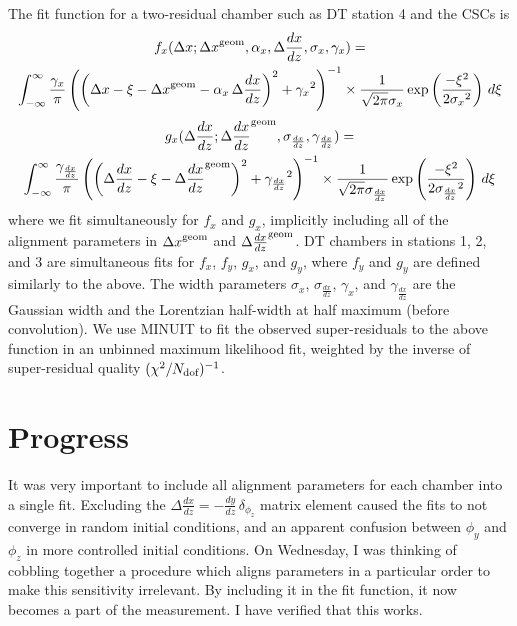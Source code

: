 \documentclass[12pt]{article}
\begin{document}
The fit function for a two-residual chamber such as DT station 4 and
the CSCs is
\begin{multline}
f_x(\Delta x; {\Delta x}^{\mbox{\scriptsize geom}}, \alpha_x, \Delta \frac{dx}{dz}, \sigma_x, \gamma_x) = \\
\int_{-\infty}^\infty
\frac{\gamma_x}{\pi}\left(\left(\Delta x - \xi - {\Delta x}^{\mbox{\scriptsize geom}} - \alpha_x \, \Delta \frac{dx}{dz}\right)^2 + {\gamma_x}^2\right)^{-1} \times 
\frac{1}{\sqrt{2\pi} \sigma_x} \exp\left(\frac{-\xi^2}{2 {\sigma_x}^2}\right) \, d\xi
\label{eqn:fitfunction1}
\end{multline}
\begin{multline}
g_x(\Delta \frac{dx}{dz}; {\Delta \frac{dx}{dz}}^{\mbox{\scriptsize geom}}, \sigma_{\frac{dx}{dz}}, \gamma_{\frac{dx}{dz}}) = \\
 \int_{-\infty}^\infty
\frac{\gamma_{\frac{dx}{dz}}}{\pi} \left(\left(\Delta \frac{dx}{dz} - \xi - {\Delta \frac{dx}{dz}}^{\mbox{\scriptsize geom}}\right)^2 + {\gamma_{\frac{dx}{dz}}}^2\right)^{-1} \times 
\frac{1}{\sqrt{2\pi} \sigma_{\frac{dx}{dz}}} \exp\left(\frac{-\xi^2}{2 {\sigma_{\frac{dx}{dz}}}^2}\right) \, d\xi
\label{eqn:fitfunction2}
\end{multline}
where we fit simultaneously for $f_x$ and $g_x$, implicitly including
all of the alignment parameters in ${\Delta x}^{\mbox{\scriptsize
    geom}}$ and ${\Delta \frac{dx}{dz}}^{\mbox{\scriptsize geom}}$.
DT chambers in stations 1, 2, and 3 are simultaneous fits for $f_x$,
$f_y$, $g_x$, and $g_y$, where $f_y$ and $g_y$ are defined similarly
to the above.  The width parameters $\sigma_x$,
$\sigma_{\frac{dx}{dz}}$, $\gamma_x$, and $\gamma_{\frac{dx}{dz}}$ are
the Gaussian width and the Lorentzian half-width at half maximum
(before convolution).  We use MINUIT to fit the observed
super-residuals to the above function in an unbinned maximum
likelihood fit, weighted by the inverse of super-residual quality
$(\chi^2/N_{\mbox{\scriptsize dof}})^{-1}$.

\section{Progress}

It was very important to include all alignment parameters for each
chamber into a single fit.  Excluding the $\Delta \frac{dx}{dz} =
-\frac{dy}{dz} \, \delta_{\phi_z}$ matrix element caused the fits to
not converge in random initial conditions, and an apparent confusion
between $\phi_y$ and $\phi_z$ in more controlled initial conditions.
On Wednesday, I was thinking of cobbling together a procedure which
aligns parameters in a particular order to make this sensitivity
irrelevant.  By including it in the fit function, it now becomes a
part of the measurement.  I have verified that this works.
\end{document}
